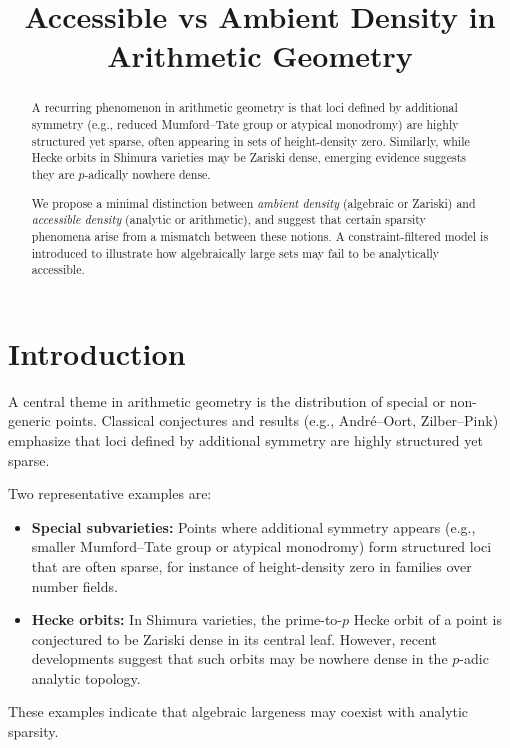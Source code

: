 \documentclass[11pt]{article}
\title{Accessible vs Ambient Density in Arithmetic Geometry}
\author{}
\date{}
\begin{document}
\maketitle

\begin{abstract}
A recurring phenomenon in arithmetic geometry is that loci defined by additional symmetry (e.g., reduced Mumford--Tate group or atypical monodromy) are highly structured yet sparse, often appearing in sets of height-density zero. Similarly, while Hecke orbits in Shimura varieties may be Zariski dense, emerging evidence suggests they are $p$-adically nowhere dense.

We propose a minimal distinction between \emph{ambient density} (algebraic or Zariski) and \emph{accessible density} (analytic or arithmetic), and suggest that certain sparsity phenomena arise from a mismatch between these notions. A constraint-filtered model is introduced to illustrate how algebraically large sets may fail to be analytically accessible.
\end{abstract}

\section{Introduction}

A central theme in arithmetic geometry is the distribution of special or non-generic points. Classical conjectures and results (e.g., André--Oort, Zilber--Pink) emphasize that loci defined by additional symmetry are highly structured yet sparse.

Two representative examples are:

\begin{itemize}
    \item \textbf{Special subvarieties:} Points where additional symmetry appears (e.g., smaller Mumford--Tate group or atypical monodromy) form structured loci that are often sparse, for instance of height-density zero in families over number fields.

    \item \textbf{Hecke orbits:} In Shimura varieties, the prime-to-$p$ Hecke orbit of a point is conjectured to be Zariski dense in its central leaf. However, recent developments suggest that such orbits may be nowhere dense in the $p$-adic analytic topology.
\end{itemize}

These examples indicate that algebraic largeness may coexist with analytic sparsity.
\end{document}
